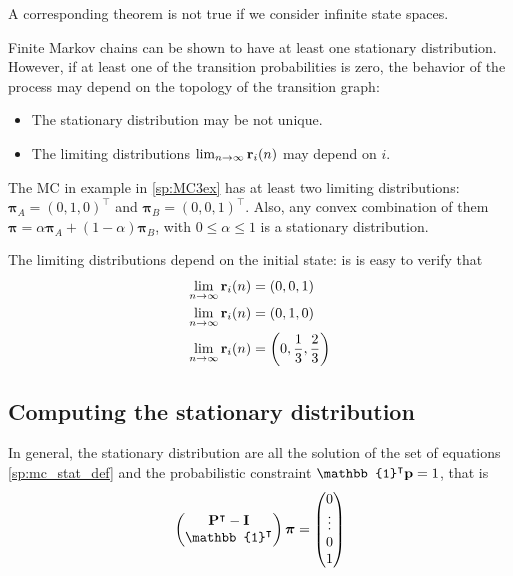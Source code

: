 A corresponding theorem is not true if we consider infinite state spaces.

Finite Markov chains can be shown to have at least one stationary distribution. However, if at least one of the transition probabilities is zero, the behavior of the process may depend on the topology of the transition graph:

\begin{itemize}
\item The stationary distribution may be not unique.
\item The limiting distributions $\lim_{n \rightarrow \infty} {\bf r}_i(n)$ may depend on $i$.
\end{itemize}

\begin{example}

The MC in example in \ref{sp:MC3ex} has at least two limiting distributions: $\bm{\pi}_A = (0, 1, 0)^\intercal$ and $\bm{\pi}_B = (0, 0, 1)^\intercal$. Also, any convex combination of them $\bm{\pi} = \alpha \bm{\pi}_A + (1-\alpha) \bm{\pi}_B$, with $0\le \alpha \le 1$ is a stationary distribution. 

The limiting distributions depend on the initial state: is is easy to verify that 
\begin{align}
\lim_{n \rightarrow \infty} {\bf r}_i(n) &= (0, 0, 1)  \\
\lim_{n \rightarrow \infty} {\bf r}_i(n) &= (0, 1, 0)  \\
\lim_{n \rightarrow \infty} {\bf r}_i(n) &= \left(0, \frac13, \frac23 \right)
\end{align}

\end{example}

\subsection{Computing the stationary distribution}

In general, the stationary distribution are all the solution of the set of equations \eqref{sp:mc_stat_def} and the probabilistic constraint $\mathbb{1}^\intercal {\bf p} =1$, that is
\begin{align}
\label{sp:mc_stat_eq}
\begin{pmatrix}
{\bf P}^\intercal - {\bf I}  \\
\mathbb{1}^\intercal   
\end{pmatrix}
\bm{\pi} = 
\begin{pmatrix}
0 \\ \vdots \\ 0 \\ 1
\end{pmatrix}
\end{align}

